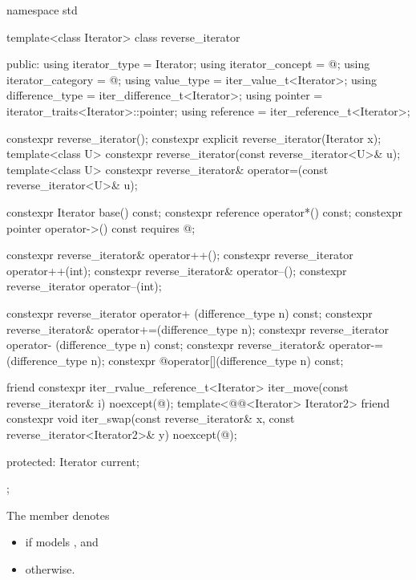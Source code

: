 %
\begin{codeblock}
namespace std {
  template<class Iterator>
  class reverse_iterator {
  public:
    using iterator_type     = Iterator;
    using iterator_concept  = @\seebelow@;
    using iterator_category = @\seebelow@;
    using value_type        = iter_value_t<Iterator>;
    using difference_type   = iter_difference_t<Iterator>;
    using pointer           = iterator_traits<Iterator>::pointer;
    using reference         = iter_reference_t<Iterator>;

    constexpr reverse_iterator();
    constexpr explicit reverse_iterator(Iterator x);
    template<class U> constexpr reverse_iterator(const reverse_iterator<U>& u);
    template<class U> constexpr reverse_iterator& operator=(const reverse_iterator<U>& u);

    constexpr Iterator base() const;
    constexpr reference operator*() const;
    constexpr pointer   operator->() const requires @\seebelow@;

    constexpr reverse_iterator& operator++();
    constexpr reverse_iterator  operator++(int);
    constexpr reverse_iterator& operator--();
    constexpr reverse_iterator  operator--(int);

    constexpr reverse_iterator  operator+ (difference_type n) const;
    constexpr reverse_iterator& operator+=(difference_type n);
    constexpr reverse_iterator  operator- (difference_type n) const;
    constexpr reverse_iterator& operator-=(difference_type n);
    constexpr @\unspec@ operator[](difference_type n) const;

    friend constexpr iter_rvalue_reference_t<Iterator>
      iter_move(const reverse_iterator& i) noexcept(@\seebelow@);
    template<@@<Iterator> Iterator2>
      friend constexpr void
        iter_swap(const reverse_iterator& x,
                  const reverse_iterator<Iterator2>& y) noexcept(@\seebelow@);

  protected:
    Iterator current;
  };
}
\end{codeblock}

\pnum
The member   denotes
\begin{itemize}
\item
{} if  models
, and
\item
{} otherwise.
\end{itemize}

